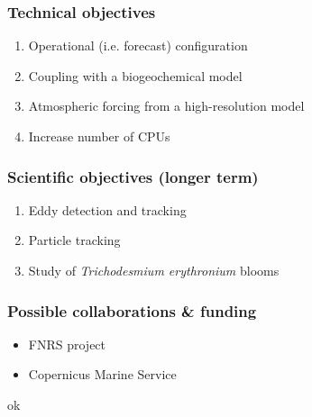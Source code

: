 \begin{frame}[c]
\frametitle{Technical objectives}
\centering

\begin{enumerate}[label=\protect\mycirc{\color{white}\arabic*}]
\item Operational (i.e. forecast) configuration
\item Coupling with a biogeochemical model
\item Atmospheric forcing from a high-resolution model
\item Increase number of CPUs
\end{enumerate}
\end{frame}


\begin{frame}[c]
\frametitle{Scientific objectives (longer term)}
\centering

\begin{enumerate}[label=\protect\mycirc{\color{white}\arabic*}]
\item Eddy detection and tracking
\item Particle tracking 
\item Study of \textit{Trichodesmium erythronium} blooms
\end{enumerate}
\end{frame}


\begin{frame}[c]
\frametitle{Possible collaborations \& funding}
\centering

\begin{itemize}
\item FNRS project 
\item Copernicus Marine Service 
\end{itemize}

\end{frame}


{
\begin{frame}[c]
ok
\end{frame}
}





